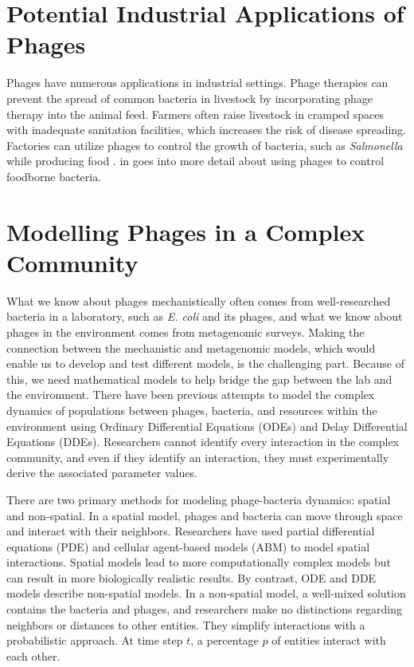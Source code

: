 \section{Potential Industrial Applications of Phages}
Phages have numerous applications in industrial settings. 
Phage therapies can prevent the spread of common bacteria in livestock by incorporating phage therapy into the animal feed. 
Farmers often raise livestock in cramped spaces with inadequate sanitation facilities, which increases the risk of disease spreading. 
Factories can utilize phages to control the growth of bacteria, such as \textit{Salmonella} while producing food \cite{sofferBacteriophagesSafelyReduce2016, kowalskaFreshVegetablesFruit2023}. 
 in  goes into more detail about using phages to control foodborne bacteria. 

\section{Modelling Phages in a Complex Community}
What we know about phages mechanistically often comes from well-researched bacteria in a laboratory, such as \textit{E. coli} and its phages, and what we know about phages in the environment comes from metagenomic surveys. 
Making the connection between the mechanistic and metagenomic models, which would enable us to develop and test different models, is the challenging part. 
Because of this, we need mathematical models to help bridge the gap between the lab and the environment. 
There have been previous attempts to model the complex dynamics of populations between phages, bacteria, and resources within the environment using Ordinary Differential Equations (ODEs) and Delay Differential Equations (DDEs).
Researchers cannot identify every interaction in the complex community, and even if they identify an interaction, they must experimentally derive the associated parameter values. 

There are two primary methods for modeling phage-bacteria dynamics: spatial and non-spatial.
In a spatial model, phages and bacteria can move through space and interact with their neighbors. 
Researchers have used partial differential equations (PDE) and cellular agent-based models (ABM) to model spatial interactions.
Spatial models lead to more computationally complex models but can result in more biologically realistic results. 
By contrast, ODE and DDE models describe non-spatial models. 
In a non-spatial model, a well-mixed solution contains the bacteria and phages, and researchers make no distinctions regarding neighbors or distances to other entities. 
They simplify interactions with a probabilistic approach.
At time step $t$, a percentage $p$ of entities interact with each other.

